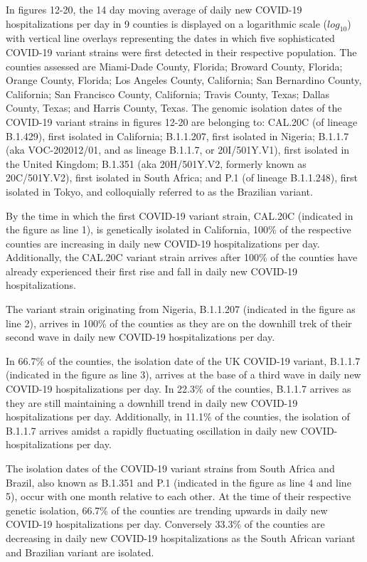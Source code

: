 \documentclass[]{article}
\begin{document}
\FloatBarrier

\indent In figures 12-20, the 14 day moving average of daily new COVID-19 hospitalizations per day in 9 counties is displayed on a logarithmic scale ($log_{10}$) with vertical line overlays representing the dates in which five sophisticated COVID-19 variant strains were first detected in their respective population. The counties assessed are Miami-Dade County, Florida; Broward County, Florida; Orange County, Florida; Los Angeles County, California; San Bernardino County, California; San Francisco County, California; Travis County, Texas; Dallas County, Texas; and Harris County, Texas. The genomic isolation dates of the COVID-19 variant strains in figures 12-20 are belonging to: CAL.20C (of lineage B.1.429), first isolated in California; B.1.1.207, first isolated in Nigeria; B.1.1.7 (aka VOC-202012/01, and as lineage B.1.1.7, or 20I/501Y.V1), first isolated in the United Kingdom; B.1.351 (aka 20H/501Y.V2, formerly known as 20C/501Y.V2), first isolated in South Africa; and P.1 (of lineage B.1.1.248), first isolated in Tokyo, and colloquially referred to as the Brazilian variant. 

\indent By the time in which the first COVID-19 variant strain, CAL.20C (indicated in the figure as line 1), is genetically isolated in California, 100\% of the respective counties are increasing in daily new COVID-19 hospitalizations per day. Additionally, the CAL.20C variant strain arrives after 100\% of the counties have already experienced their first rise and fall in daily new COVID-19 hospitalizations. 

\indent The variant strain originating from Nigeria, B.1.1.207 (indicated in the figure as line 2), arrives in 100\% of the counties as they are on the downhill trek of their second wave in daily new COVID-19 hospitalizations per day. 

\indent In 66.7\% of the counties, the isolation date of the UK COVID-19 variant, B.1.1.7 (indicated in the figure as line 3), arrives at the base of a third wave in daily new COVID-19 hospitalizations per day. In 22.3\% of the counties, B.1.1.7 arrives as they are still maintaining a downhill trend in daily new COVID-19 hospitalizations per day. Additionally, in 11.1\% of the counties, the isolation of B.1.1.7 arrives amidst a rapidly fluctuating oscillation in daily new COVID-hospitalizations per day. 

\indent The isolation dates of the COVID-19 variant strains from South Africa and Brazil, also known as B.1.351 and P.1 (indicated in the figure as line 4 and line 5), occur with one month relative to each other. At the time of their respective genetic isolation, 66.7\% of the counties are trending upwards in daily new COVID-19 hospitalizations per day. Conversely 33.3\% of the counties are decreasing in daily new COVID-19 hospitalizations as the South African variant and Brazilian variant are isolated. 
\end{document}
